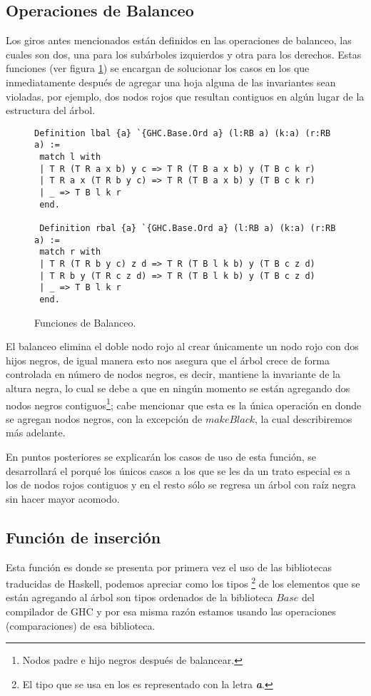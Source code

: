 \subsection{Operaciones de Balanceo}
Los giros antes mencionados están definidos en las operaciones de balanceo, las cuales son dos, una para
los subárboles izquierdos y otra para los derechos. Estas funciones (ver figura \ref{func_balanceo})
se encargan de solucionar los casos en los que inmediatamente después de agregar una hoja alguna de 
las invariantes sean violadas, por ejemplo, dos nodos rojos que resultan contiguos en algún lugar 
de la estructura del \'arbol.

\begin{figure}[!ht]
\centering
\captionsetup{justification=centering}
\begin{verbatim}
Definition lbal {a} `{GHC.Base.Ord a} (l:RB a) (k:a) (r:RB a) :=
 match l with
 | T R (T R a x b) y c => T R (T B a x b) y (T B c k r)
 | T R a x (T R b y c) => T R (T B a x b) y (T B c k r)
 | _ => T B l k r
 end.

 Definition rbal {a} `{GHC.Base.Ord a} (l:RB a) (k:a) (r:RB a) :=
 match r with
 | T R (T R b y c) z d => T R (T B l k b) y (T B c z d)
 | T R b y (T R c z d) => T R (T B l k b) y (T B c z d)
 | _ => T B l k r
 end.
\end{verbatim}
\caption{Funciones de Balanceo.}
\label{func_balanceo}
\end{figure}

El balanceo elimina el doble nodo rojo al crear \'unicamente un nodo rojo con dos hijos negros, de 
igual manera esto nos asegura que el árbol crece de forma controlada en n\'umero de nodos negros, es decir,
mantiene la invariante de la altura negra, lo cual se debe a que en ningún
momento se están agregando dos nodos negros contiguos\footnote{Nodos padre e hijo negros después de
balancear.}; cabe mencionar que esta es la única operación en donde se agregan nodos negros, con la
excepción de $makeBlack$, la cual describiremos m\'as adelante.

En puntos posteriores se explicar\'an los casos de uso de esta función, se desarrollar\'a el 
porqu\'e los \'unicos casos a los que se les da un trato especial es a los de nodos rojos contiguos
y en el resto s\'olo se regresa un \'arbol con ra\'iz negra sin hacer mayor acomodo.

\subsection {Funci\'on de inserci\'on}
Esta funci\'on es donde se presenta por primera vez el uso de las bibliotecas traducidas de
Haskell, podemos apreciar como los tipos \footnote{El tipo que se usa en los {\arns} es representado 
con la letra \textbf{\textit{a}}.} de los elementos que se est\'an agregando al \'arbol son tipos
ordenados de la biblioteca $Base$ del compilador de GHC y por esa misma raz\'on estamos usando las
operaciones (comparaciones) de esa biblioteca.

